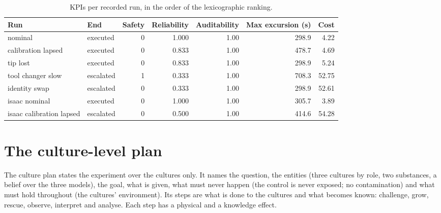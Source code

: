 \documentclass[10pt,a4paper]{article}
\begin{document}
\begin{table}[tbp]\centering\small
\caption{KPIs per recorded run, in the order of the lexicographic ranking.}\label{tab:kpiruns}
\begin{tabularx}{\linewidth}{Xlrrrrr}\toprule
\textbf{Run} & \textbf{End} & \textbf{Safety} & \textbf{Reliability} & \textbf{Auditability} & \textbf{Max excursion (s)} & \textbf{Cost} \\\midrule
nominal & executed & 0 & 1.000 & 1.00 & 298.9 & 4.22 \\
calibration lapsed & executed & 0 & 0.833 & 1.00 & 478.7 & 4.69 \\
tip lost & executed & 0 & 0.833 & 1.00 & 298.9 & 5.24 \\
tool changer slow & escalated & 1 & 0.333 & 1.00 & 708.3 & 52.75 \\
identity swap & escalated & 0 & 0.333 & 1.00 & 298.9 & 52.61 \\
isaac nominal & executed & 0 & 1.000 & 1.00 & 305.7 & 3.89 \\
isaac calibration lapsed & escalated & 0 & 0.500 & 1.00 & 414.6 & 54.28 \\\bottomrule
\end{tabularx}
\end{table}

\section{The culture-level plan}\label{sec:culture}

The culture plan states the experiment over the cultures only. It names the question, the entities (three cultures by role, two substances, a belief over the three models), the goal, what is given, what must never happen (the control is never exposed; no contamination) and what must hold throughout (the cultures' environment). Its steps are what is done to the cultures and what becomes known: challenge, grow, rescue, observe, interpret and analyse. Each step has a physical and a knowledge effect.
\end{document}
